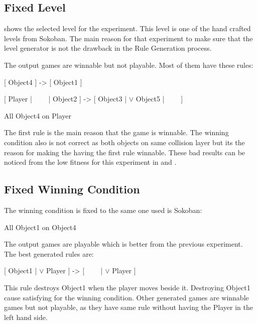 \subsection{Fixed Level}
 shows the selected level for the experiment. This level is one of the hand crafted levels from Sokoban. The main reason for that experiment to make sure that the level generator is not the drawback in the Rule Generation process.\\\par


The output games are winnable but not playable. Most of them have these rules:
\begin{center}
[ Object4 ] -> [ Object1 ]
\end{center}
\begin{center}
[ Player | \ \ \ \ |  Object2 ] -> [  Object3 | $\vee$ Object5 | \ \ \ \ ]
\end{center}
\begin{center}
All Object4 on Player
\end{center}
The first rule is the main reason that the game is winnable. The winning condition also is not correct as both objects on same collision layer but its the reason for making the having the first rule winnable. These bad results can be noticed from the low fitness for this experiment in  and .

\subsection{Fixed Winning Condition}
The winning condition is fixed to the same one used is Sokoban:
\begin{center}
All Object1 on Object4
\end{center}

The output games are playable which is better from the previous experiment. The best generated rules are:
\begin{center}
[  Object1 | $\vee$ Player ] -> [ \ \ \ \ | $\vee$ Player ]
\end{center}
This rule destroys Object1 when the player moves beside it. Destroying Object1 cause satisfying for the winning condition. Other generated games are winnable games but not playable, as they have same rule without having the Player in the left hand side.

